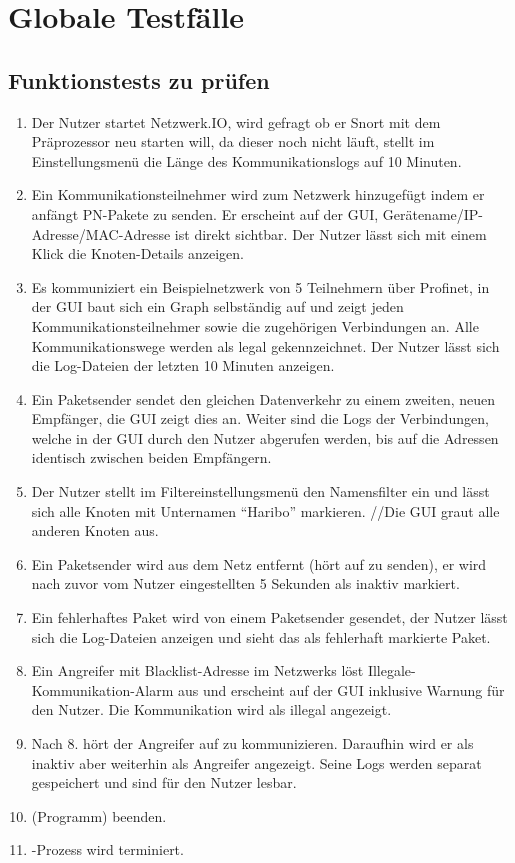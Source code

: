 \chapter{Globale Testfälle}

\section{Funktionstests zu prüfen}

\begin{enumerate}
  \item {} Der Nutzer startet Netzwerk.IO, wird gefragt ob er Snort mit dem Präprozessor neu starten will, da dieser noch nicht läuft, stellt im Einstellungsmenü die Länge des Kommunikationslogs auf 10 Minuten.
  \item \label{2} Ein Kommunikationsteilnehmer wird zum Netzwerk hinzugefügt indem er anfängt PN-Pakete zu senden. Er erscheint auf der GUI, Gerätename/IP-Adresse/MAC-Adresse ist direkt sichtbar. Der Nutzer lässt sich mit einem Klick die Knoten-Details anzeigen.
  \item \label{3} Es kommuniziert ein Beispielnetzwerk von 5 Teilnehmern über Profinet, in der GUI baut sich ein Graph selbständig auf und zeigt jeden Kommunikationsteilnehmer sowie die zugehörigen Verbindungen an. Alle Kommunikationswege werden als legal gekennzeichnet. Der Nutzer lässt sich die Log-Dateien der letzten 10 Minuten anzeigen.
  \item \label{4}Ein Paketsender sendet den gleichen Datenverkehr zu einem zweiten, neuen Empfänger, die GUI zeigt dies an. Weiter sind die Logs der Verbindungen, welche in der GUI durch den Nutzer abgerufen werden, bis auf die Adressen identisch zwischen beiden Empfängern.
  \item \label{5} Der Nutzer stellt im Filtereinstellungsmenü den Namensfilter ein und lässt sich alle Knoten mit Unternamen “Haribo” markieren. //Die GUI graut alle anderen Knoten aus.
  \item \label{6} Ein Paketsender wird aus dem Netz entfernt (hört auf zu senden), er wird nach zuvor vom Nutzer eingestellten 5 Sekunden als inaktiv markiert.
  \item \label{7}Ein fehlerhaftes Paket wird von einem Paketsender gesendet, der Nutzer lässt sich die Log-Dateien anzeigen und sieht das als fehlerhaft markierte Paket.
  \item \label{8}Ein Angreifer mit Blacklist-Adresse im Netzwerks löst Illegale-Kommunikation-Alarm aus und erscheint auf der GUI inklusive Warnung für den Nutzer. Die Kommunikation wird als illegal angezeigt.
  \item \label{9}Nach 8. hört der Angreifer auf zu kommunizieren. Daraufhin wird er als inaktiv aber weiterhin als Angreifer angezeigt. Seine Logs werden separat gespeichert und sind für den Nutzer lesbar.
  \item \label{Exit} \programname (Programm) beenden.
  \item \label{Absturz} \programname-Prozess wird terminiert.
\end{enumerate}

